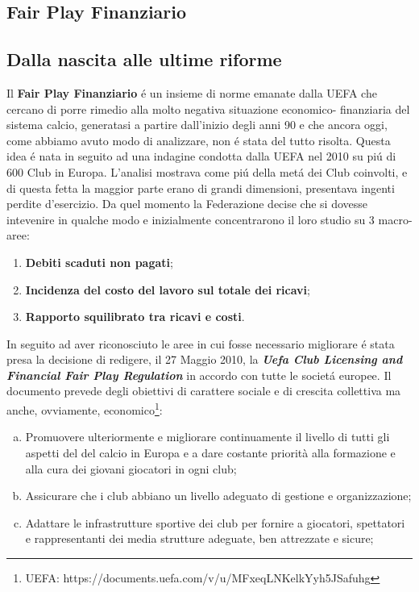 \documentclass[
    corpo=12pt,
    oneside,
    evenboxes,
    tipotesi=triennale,
    stile=classica,
    oldstyle,
    autoretitolo,
    greek,
]{toptesi}
\begin{document}
\begin{interlinea}{1.5}
\chapter{Fair Play Finanziario}
\section{Dalla nascita alle ultime riforme}
Il \textbf{Fair Play Finanziario} \'e un insieme di norme emanate dalla UEFA che cercano di porre rimedio alla molto negativa situazione economico-
finanziaria del sistema calcio, generatasi a partire dall'inizio degli anni 90 e che ancora oggi, come abbiamo avuto modo di analizzare, non 
\'e stata del tutto risolta.
Questa idea \'e nata in seguito ad una indagine condotta dalla UEFA nel 2010 su pi\'u di 600 Club in Europa. 
L'analisi mostrava come pi\'u della met\'a dei Club coinvolti, e di questa fetta la maggior parte erano di grandi dimensioni, 
presentava ingenti perdite d'esercizio. Da quel momento la Federazione decise che si dovesse intevenire in qualche modo e inizialmente
concentrarono il loro studio su 3 macro-aree:
\begin{enumerate}
    \item \textbf{Debiti scaduti non pagati};
    \item \textbf{Incidenza del costo del lavoro sul totale dei ricavi};
    \item \textbf{Rapporto squilibrato tra ricavi e costi}.
\end{enumerate}
In seguito ad aver riconosciuto le aree in cui fosse necessario migliorare \'e stata presa la decisione di redigere, il 27 Maggio 2010, la 
\textbf{\emph{Uefa Club Licensing and Financial Fair Play Regulation}} in accordo con tutte le societ\'a europee.
Il documento prevede degli obiettivi di carattere sociale e di crescita collettiva ma anche, ovviamente, economico\footnote{UEFA: https://documents.uefa.com/v/u/MFxeqLNKelkYyh5JSafuhg}:
\begin{enumerate}[(a)]
    \item Promuovere ulteriormente e migliorare continuamente il livello di tutti gli aspetti del
    del calcio in Europa e a dare costante priorità alla formazione e alla cura dei
    giovani giocatori in ogni club; 
    \item Assicurare che i club abbiano un livello adeguato di gestione e organizzazione;
    \item Adattare le infrastrutture sportive dei club per fornire a giocatori, spettatori e rappresentanti dei media
    strutture adeguate, ben attrezzate e sicure;

\end{enumerate}
\end{interlinea}
\end{document}
